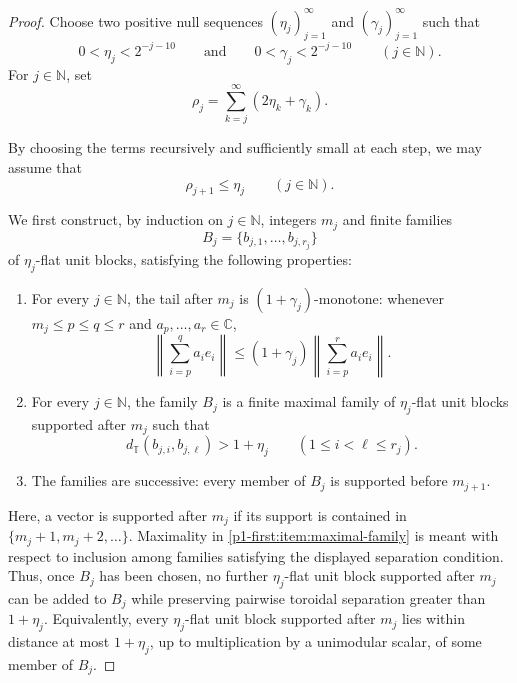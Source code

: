 \documentclass[10pt,a4paper]{amsart}
\newcommand{\C}{\mathbb C}
\newcommand{\N}{\mathbb N}
\newcommand{\distT}{d_{\mathbb T}}
\begin{document}
\begin{proof}
Choose two positive null sequences $(\eta_j)_{j=1}^{\infty}$ and $(\gamma_j)_{j=1}^{\infty}$ such that
\begin{equation*}
        0<\eta_j<2^{-j-10}
        \qquad\text{and}\qquad
        0<\gamma_j<2^{-j-10}
        \qquad(j\in\N).
\end{equation*}
For $j\in\N$, set
\begin{equation*}
        \rho_j=\sum_{k=j}^{\infty}(2\eta_k+\gamma_k).
\end{equation*}

By choosing the terms recursively and sufficiently small at each step, we may assume that
\begin{equation*}
        \rho_{j+1}\leq \eta_j \qquad(j\in\N).
\end{equation*}

We first construct, by induction on $j\in\N$, integers $m_j$ and finite families
\begin{equation*}
        B_j=\{b_{j,1},\ldots,b_{j,r_j}\}
\end{equation*}
of $\eta_j$-flat unit blocks, satisfying the following properties:

\begin{enumerate}[label=\textup{(\roman*)}]
\item For every $j\in\N$, the tail after $m_j$ is $(1+\gamma_j)$-monotone: whenever $m_j\leq p\leq q\leq r$ and $a_p,\ldots,a_r\in\C$,
\begin{equation}
\label{p1-first:eq:tail-projection}
        \left\|\sum_{i=p}^{q}a_ie_i\right\|\leq (1+\gamma_j)\left\|\sum_{i=p}^{r}a_ie_i\right\|.
\end{equation}

\item\label{p1-first:item:maximal-family} For every $j\in\N$, the family $B_j$ is a finite maximal family of $\eta_j$-flat unit blocks supported after $m_j$ such that
\begin{equation*}
        \distT(b_{j,i},b_{j,\ell})>1+\eta_j \qquad(1\leq i<\ell\leq r_j).
\end{equation*}

\item The families are successive: every member of $B_j$ is supported before $m_{j+1}$.
\end{enumerate}

Here, a vector is supported after $m_j$ if its support is contained in $\{m_j+1,m_j+2,\ldots\}$. Maximality in \ref{p1-first:item:maximal-family} is meant with respect to inclusion among families satisfying the displayed separation condition. Thus, once $B_j$ has been chosen, no further $\eta_j$-flat unit block supported after $m_j$ can be added to $B_j$ while preserving pairwise toroidal separation greater than $1+\eta_j$. Equivalently, every $\eta_j$-flat unit block supported after $m_j$ lies within distance at most $1+\eta_j$, up to multiplication by a unimodular scalar, of some member of $B_j$.


\end{proof}
\end{document}

